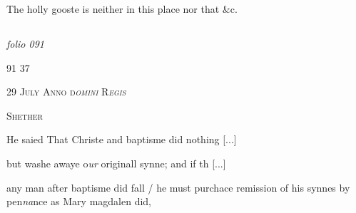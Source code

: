 \documentclass[12pt, a4paper]{book}
\begin{document}
               		
		\ifthenelse{\isodd{\thepage}}
		{\reversemarginpar}
		{\normalmarginpar}
		The holly gooste is neither in this place
               			nor that \&c.
               	

            
            
\dotfill
					  \subsection*{}  \subsection*{}  \subsection*{}

\textit{folio 091}


\begin{flushright}{\color{Mahogany}91} 37\end{flushright}
 

               
				\begin{center} \begin{large} {\scshape 
                  29 July Anno d\textit{omini} R\textit{egis}
                  
               } \end{large} \end{center}
			
               
                  
				\begin{center}  {\scshape Shether}  \end{center}
			
               	
				\marginpar[\vspace{0.5cm}{\textcolor{Gray}{n}}]{}
			 
		\ifthenelse{\isodd{\thepage}}
		{\reversemarginpar}
		{\normalmarginpar}
		He saied That Christe and baptisme did nothing 
				[...]
			
                  
 but washe awaye o\textit{ur} originall synne; and if th
				[...]
			
  any man after baptisme did fall / he must
 purchace remission of his synnes by pen\textit{na}nce as
               		Mary magdalen did,
\end{document}
